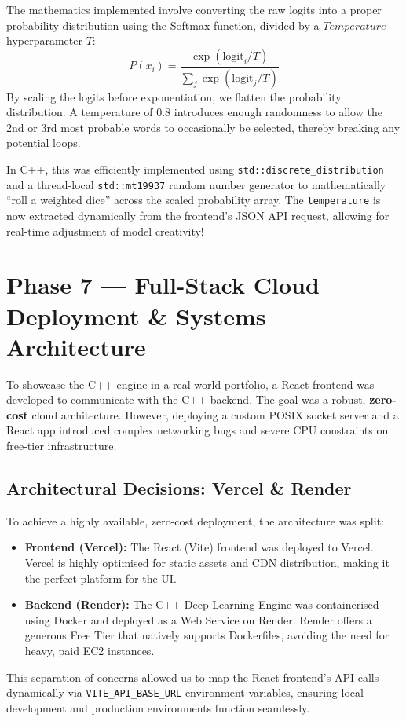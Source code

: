 \documentclass[12pt, a4paper]{article}
\begin{document}
The mathematics implemented involve converting the raw logits into a proper probability distribution using the Softmax function, divided by a $Temperature$ hyperparameter $T$:
\[
P(x_i) = \frac{\exp(\text{logit}_i / T)}{\sum_{j} \exp(\text{logit}_j / T)}
\]
By scaling the logits before exponentiation, we flatten the probability distribution. A temperature of $0.8$ introduces enough randomness to allow the 2nd or 3rd most probable words to occasionally be selected, thereby breaking any potential loops. 

In C++, this was efficiently implemented using \texttt{std::discrete\_distribution} and a thread-local \texttt{std::mt19937} random number generator to mathematically ``roll a weighted dice'' across the scaled probability array. The \texttt{temperature} is now extracted dynamically from the frontend's JSON API request, allowing for real-time adjustment of model creativity!

\newpage
\section{Phase 7 --- Full-Stack Cloud Deployment \& Systems Architecture}

\begin{tcolorbox}[designbox, title={Phase 7 Problem Statement}]
  To showcase the C++ engine in a real-world portfolio, a React frontend was developed to communicate with the C++ backend. The goal was a robust, \textbf{zero-cost} cloud architecture. However, deploying a custom POSIX socket server and a React app introduced complex networking bugs and severe CPU constraints on free-tier infrastructure.
\end{tcolorbox}

\subsection{Architectural Decisions: Vercel \& Render}
To achieve a highly available, zero-cost deployment, the architecture was split:
\begin{itemize}
    \item \textbf{Frontend (Vercel):} The React (Vite) frontend was deployed to Vercel. Vercel is highly optimised for static assets and CDN distribution, making it the perfect platform for the UI.
    \item \textbf{Backend (Render):} The C++ Deep Learning Engine was containerised using Docker and deployed as a Web Service on Render. Render offers a generous Free Tier that natively supports Dockerfiles, avoiding the need for heavy, paid EC2 instances.
\end{itemize}
This separation of concerns allowed us to map the React frontend's API calls dynamically via \texttt{VITE\_API\_BASE\_URL} environment variables, ensuring local development and production environments function seamlessly.
\end{document}
